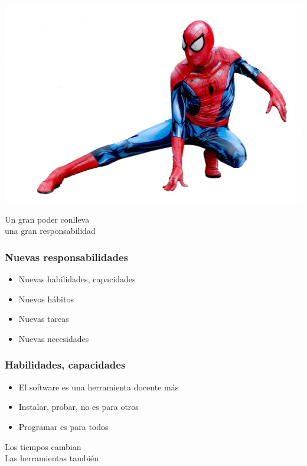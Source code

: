 \documentclass[17pt,aspectratio=169]{beamer}
\begin{document}
\begin{frame}

\includegraphics[height=.7\textheight]{figs/spiderman.jpg}

{\Large
\begin{center}
  Un gran poder conlleva \\
  una gran responsabilidad \\
\end{center}
}

\end{frame}


\begin{frame}
\frametitle{Nuevas responsabilidades}

\begin{itemize}
\item Nuevas habilidades, capacidades
\item Nuevos hábitos
\item Nuevas tareas
\item Nuevas necesidades
\end{itemize}

\end{frame}


\begin{frame}
\frametitle{Habilidades, capacidades}

\begin{itemize}
\item El software es una herramienta docente más
\item Instalar, probar, no es para otros
\item Programar es para todos
\end{itemize}

\begin{flushright}
  Los tiempos cambian \\
  Las herramientas también \\
\end{flushright}
\end{frame}
\end{document}
